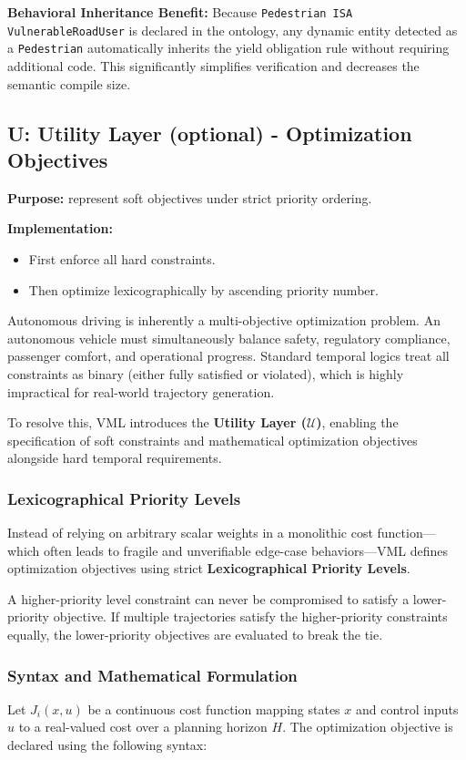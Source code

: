 \documentclass[11pt,a4paper]{article}
\begin{document}
\textbf{Behavioral Inheritance Benefit:} Because \texttt{Pedestrian ISA VulnerableRoadUser} is declared in the ontology, any dynamic entity detected as a \texttt{Pedestrian} automatically inherits the yield obligation rule without requiring additional code. This significantly simplifies verification and decreases the semantic compile size.

\subsection{U: Utility Layer (optional) - Optimization Objectives}

\textbf{Purpose:} represent soft objectives under strict priority ordering.

\textbf{Implementation:}
\begin{itemize}[leftmargin=*]
  \item First enforce all hard constraints.
  \item Then optimize lexicographically by ascending priority number.
\end{itemize}

Autonomous driving is inherently a multi-objective optimization problem. An autonomous vehicle must simultaneously balance safety, regulatory compliance, passenger comfort, and operational progress. Standard temporal logics treat all constraints as binary (either fully satisfied or violated), which is highly impractical for real-world trajectory generation.

To resolve this, VML introduces the \textbf{Utility Layer ($\mathcal{U}$)}, enabling the specification of soft constraints and mathematical optimization objectives alongside hard temporal requirements.

\subsubsection{Lexicographical Priority Levels}
Instead of relying on arbitrary scalar weights in a monolithic cost function—which often leads to fragile and unverifiable edge-case behaviors—VML defines optimization objectives using strict \textbf{Lexicographical Priority Levels}. 

A higher-priority level constraint can never be compromised to satisfy a lower-priority objective. If multiple trajectories satisfy the higher-priority constraints equally, the lower-priority objectives are evaluated to break the tie.

\subsubsection{Syntax and Mathematical Formulation}
Let $J_i(x, u)$ be a continuous cost function mapping states $x$ and control inputs $u$ to a real-valued cost over a planning horizon $H$. The optimization objective is declared using the following syntax:
\end{document}
